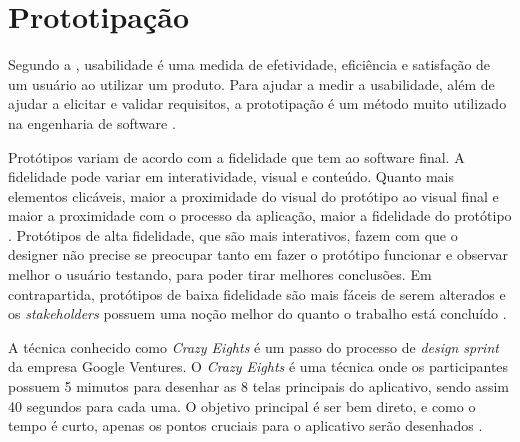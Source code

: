 \section{Prototipação}

Segundo a , usabilidade é uma medida de efetividade, eficiência e satisfação de um usuário ao utilizar um produto. Para ajudar a medir a usabilidade, além de ajudar a elicitar e validar requisitos, a prototipação é um método muito utilizado na engenharia de software \cite{sommerville}.

Protótipos variam de acordo com a fidelidade que tem ao software final. A fidelidade pode variar em interatividade, visual e conteúdo. Quanto mais elementos clicáveis, maior a proximidade do visual do protótipo ao visual final e maior a proximidade com o processo da aplicação, maior a fidelidade do protótipo \cite{nielsen}. Protótipos de alta fidelidade, que são mais interativos, fazem com que o designer não precise se preocupar tanto em fazer o protótipo funcionar e observar melhor o usuário testando, para poder tirar melhores conclusões. Em contrapartida, protótipos de baixa fidelidade são mais fáceis de serem alterados e os \textit{stakeholders} possuem uma noção melhor do quanto o trabalho está concluído \cite{nielsen}.

A técnica conhecido como \textit{Crazy Eights} é um passo do processo de \textit{design sprint} da empresa Google Ventures. O \textit{Crazy Eights} é uma técnica onde os participantes possuem 5 mimutos para desenhar as 8 telas principais do aplicativo, sendo assim 40 segundos para cada uma. O objetivo principal é ser bem direto, e como o tempo é curto, apenas os pontos cruciais para o aplicativo serão desenhados \cite{knapp}.
